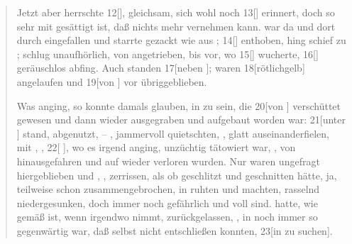 \begin{nohyphens}
\begin{quote}
\begin{linenumbers}
      Jetzt aber herrschte 12[],  gleichsam,  sich wohl noch 13[] erinnert, doch so sehr mit  gesättigt ist, daß  nichts mehr vernehmen kann.
       war da und dort durch  eingefallen und starrte gezackt wie  aus ; 14[] enthoben, hing  schief zu ;  schlug unaufhörlich, von  angetrieben, bis   vor, wo 15[] wucherte, 16[]  geräuschlos abfing.
      Auch  standen 17[neben ];  waren 18[rötlichgelb] angelaufen und 19[von ] vor  übriggeblieben.

      Was  anging, so konnte  damals glauben, in  zu sein, die 20[von ] verschüttet gewesen und dann wieder ausgegraben und aufgebaut worden war: 21[unter ] stand, abgenutzt,   – ,  jammervoll quietschten, ,  glatt auseinanderfielen,  mit , , 22[ ], wo es irgend anging, unzüchtig tätowiert war, ,  von  hinausgefahren und auf  wieder verloren wurden.
      Nur  waren ungefragt hiergeblieben und , , zerrissen, als ob   geschlitzt und geschnitten hätte, ja, teilweise schon zusammengebrochen, in  ruhten und   machten,  rasselnd niedergesunken, doch immer noch gefährlich und voll  sind.
       hatte, wie  gemäß ist, wenn  irgendwo  nimmt,  zurückgelassen, , in   noch immer so gegenwärtig war, daß selbst   nicht entschließen konnten, 23[in   zu suchen].
    \end{linenumbers}
  \end{quote}
\end{nohyphens}

